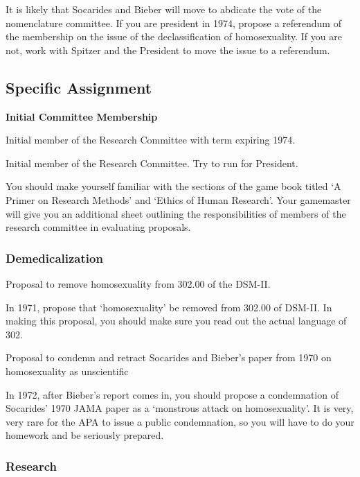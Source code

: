 \begin{refsection}
It is likely that Socarides and Bieber will move to abdicate the vote of the nomenclature committee. If you are president in 1974, propose a referendum of the membership on the issue of the declassification of homosexuality. If you are not, work with Spitzer and the President to move the issue to a referendum.

\subsection{Specific Assignment}
\label{specificassignment}

\textbf{Initial Committee Membership}
\begin{service}[Marmor]\label{service:marmor}
Initial member of the Research Committee with term expiring 1974.
\end{service}
Initial member of the Research Committee.
Try to run for President.

You should make yourself familiar with the sections of the game book titled `A Primer on Research Methods' and `Ethics of Human Research'. Your gamemaster will give you an additional sheet outlining the responsibilities of members of the research committee in evaluating proposals.

\subsubsection{Demedicalization}
\label{demedicalization}

\begin{proposal}[Marmor]\label{proposal:marmorA}Proposal to remove homosexuality from 302.00 of the DSM-II.\end{proposal}

In 1971, propose that `homosexuality' be removed from 302.00 of DSM-II. In making this proposal, you should make sure you read out the actual language of 302.

\begin{proposal}[Marmor]\label{proposal:marmorB}Proposal to condemn and retract Socarides and Bieber's paper from 1970 on homosexuality as unscientific
\end{proposal}

In 1972, after Bieber's report comes in, you should propose a condemnation of Socarides' 1970 JAMA paper as a `monstrous attack on homosexuality'. It is very, very rare for the APA to issue a public condemnation, so you will have to do your homework and be seriously prepared.

\subsubsection{Research}
\label{research}


\end{refsection}
